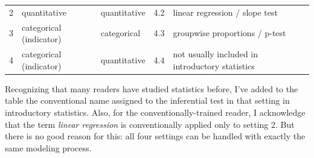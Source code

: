 \documentclass[]{tufte-book}
\begin{document}
\begin{longtable}[]{@{}lllll@{}}
\begin{minipage}[t]{0.03\columnwidth}
2\strut
\end{minipage} & \begin{minipage}[t]{0.24\columnwidth}\raggedright
quantitative\strut
\end{minipage} & \begin{minipage}[t]{0.29\columnwidth}\raggedright
quantitative\strut
\end{minipage} & \begin{minipage}[t]{0.15\columnwidth}\raggedright
4.2\strut
\end{minipage} & \begin{minipage}[t]{0.14\columnwidth}\raggedright
linear regression / slope test\strut
\end{minipage}\tabularnewline
\begin{minipage}[t]{0.03\columnwidth}\raggedright
3\strut
\end{minipage} & \begin{minipage}[t]{0.24\columnwidth}\raggedright
categorical (indicator)\strut
\end{minipage} & \begin{minipage}[t]{0.29\columnwidth}\raggedright
categorical\strut
\end{minipage} & \begin{minipage}[t]{0.15\columnwidth}\raggedright
4.3\strut
\end{minipage} & \begin{minipage}[t]{0.14\columnwidth}\raggedright
groupwise proportions / p-test\strut
\end{minipage}\tabularnewline
\begin{minipage}[t]{0.03\columnwidth}\raggedright
4\strut
\end{minipage} & \begin{minipage}[t]{0.24\columnwidth}\raggedright
categorical (indicator)\strut
\end{minipage} & \begin{minipage}[t]{0.29\columnwidth}\raggedright
quantitative\strut
\end{minipage} & \begin{minipage}[t]{0.15\columnwidth}\raggedright
4.4\strut
\end{minipage} & \begin{minipage}[t]{0.14\columnwidth}\raggedright
not usually included in introductory statistics\strut
\end{minipage}\tabularnewline
\bottomrule
\end{longtable}

Recognizing that many readers have studied statistics before, I've added to the table the conventional name assigned to the inferential test in that setting in introductory statistics. Also, for the conventionally-trained reader, I acknowledge that the term \emph{linear regression} is conventionally applied only to setting 2. But there is no good reason for this: all four settings can be handled with exactly the same modeling process.
\end{document}
